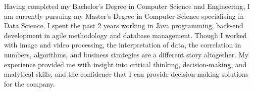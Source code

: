 Having completed my Bachelor’s Degree in Computer Science and Engineering, I am currently pursuing my Master’s Degree in Computer Science specialising in Data Science. I spent the past 2 years working in Java programming, back-end development in agile methodology and database management.
{Though I worked with image and video processing, the interpretation of data, the correlation in numbers, algorithms, and business strategies are a different story altogether.}
My experience provided me with insight into critical thinking, decision-making, and analytical skills, and the confidence that I can provide decision-making solutions for the company.